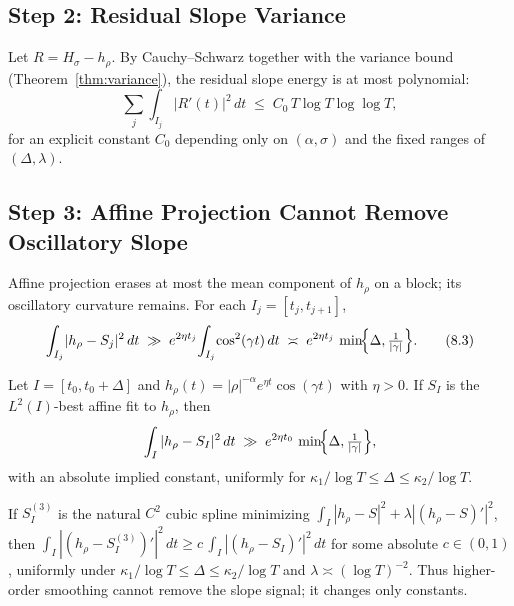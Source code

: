 \subsection{Step 2: Residual Slope Variance}\label{step:residual-variance}

Let $R=H_\sigma-h_\rho$.  By Cauchy–Schwarz together with the variance bound
(Theorem~\ref{thm:variance}), the residual slope energy is at most polynomial:
\begin{equation}
\sum_j\!\int_{I_j}\!|R'(t)|^2\,dt
   \;\le\; C_0\,T\log T\log\log T,
\tag{8.2}\label{eq:residual-variance}
\end{equation}
for an explicit constant $C_0$ depending only on $(\alpha,\sigma)$ and the fixed ranges of
$(\Delta,\lambda)$.

\subsection{Step 3: Affine Projection Cannot Remove Oscillatory Slope}\label{step:affine-energy}

Affine projection erases at most the mean component of $h_\rho$ on a block; its oscillatory
curvature remains.  For each $I_j=[t_j,t_{j+1}]$,
\begin{equation}
\int_{I_j}\!|h_\rho-S_j|^2\,dt
   \;\gg\; e^{2\eta t_j}\!\int_{I_j}\!\cos^2(\gamma t)\,dt
   \;\asymp\; e^{2\eta t_j}\,\min\!\Bigl\{\Delta,\tfrac{1}{|\gamma|}\Bigr\}.
\tag{8.3}\label{eq:affine-energy}
\end{equation}

\begin{lemma}\label{lem:affine-lb}
Let $I=[t_0,t_0+\Delta]$ and $h_\rho(t)=|\rho|^{-\alpha} e^{\eta t}\cos(\gamma t)$ with $\eta>0$.
If $S_I$ is the $L^2(I)$-best affine fit to $h_\rho$, then
\[
\int_I |h_\rho - S_I|^2\,dt \;\gg\; e^{2\eta t_0}\,\min\!\Bigl\{\Delta,\tfrac{1}{|\gamma|}\Bigr\},
\]
with an absolute implied constant, uniformly for $\kappa_1/\log T \le \Delta \le \kappa_2/\log T$.
\end{lemma}

\begin{remark}\label{rmk:cubic}
If $S_I^{(3)}$ is the natural $C^2$ cubic spline minimizing
$\int_I |h_\rho-S|^2+\lambda|(h_\rho-S)'|^2$, then
\(
\int_I |(h_\rho-S_I^{(3)})'|^2\,dt
\ge c\,\int_I |(h_\rho-S_I)'|^2\,dt
\)
for some absolute $c\in(0,1)$, uniformly under
$\kappa_1/\log T \le \Delta \le \kappa_2/\log T$ and $\lambda \asymp (\log T)^{-2}$.
Thus higher-order smoothing cannot remove the slope signal; it changes only constants.
\end{remark}

